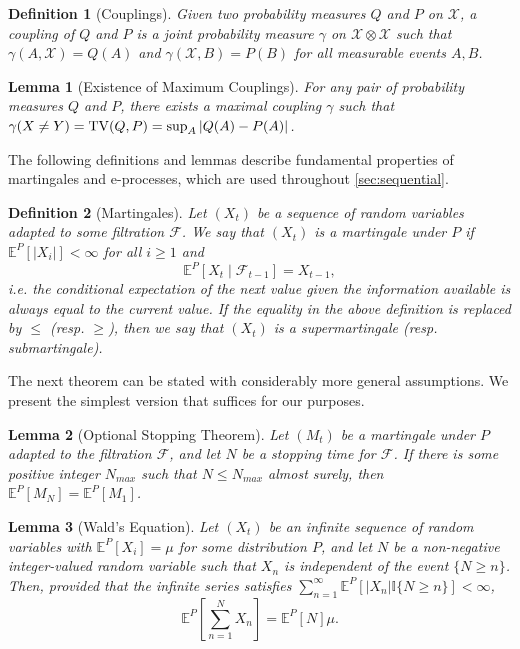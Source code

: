 \documentclass{article}
\DeclareMathOperator{\TVop}{TV}
\newcommand{\TV}[2]{
  \mathchoice
    {\TVop\!\left(#1,#2\right)}%
    {\TVop(#1,#2)}%
    {\TVop(#1,#2)}%
    {\TVop(#1,#2)}%
}
\newcommand{\E}{\mathbb{E}}
\newtheorem{lemma}{Lemma}[theorem]
\newtheorem{definition}{Definition}[section]
\begin{document}
\begin{definition}[Couplings]
    Given two probability measures $Q$ and $P$ on $\mathcal{X}$, a coupling of $Q$ and $P$ is a joint probability measure $\gamma$ on $\mathcal{X} \otimes \mathcal{X}$ such that $\gamma(A, \mathcal{X}) = Q(A)$ and $\gamma(\mathcal{X}, B) = P(B)$ for all measurable events $A, B$.
\end{definition}

\begin{lemma}[Existence of Maximum Couplings]\label{lem:tv-coupling}
    For any pair of probability measures $Q$ and $P$, there exists a maximal coupling $\gamma$ such that $\gamma(X \neq Y) = \TV{Q}{P} = \sup_A|Q(A) - P(A)|$. 
\end{lemma}

The following definitions and lemmas describe fundamental properties of martingales and e-processes, which are used throughout \cref{sec:sequential}.

\begin{definition}[Martingales]
    Let $(X_t)$ be a sequence of random variables adapted to some filtration $\mathcal{F}$. We say that $(X_t)$ is a martingale under $P$ if $\E^P[|X_i|] < \infty$ for all $i \geq 1$ and
    \begin{equation*}
        \E^P[X_t \mid \mathcal{F}_{t-1}] = X_{t-1},
    \end{equation*}
    i.e. the conditional expectation of the next value given the information available is always equal to the current value. If the equality in the above definition is replaced by $\leq$ (resp. $\geq$), then we say that $(X_t)$ is a supermartingale (resp. submartingale).
\end{definition}
 
The next theorem can be stated with considerably more general assumptions. We present the simplest version that suffices for our purposes. 

\begin{lemma}[Optional Stopping Theorem]\label{lem:optional_stopping}
    Let $(M_t)$ be a martingale under $P$ adapted to the filtration $\mathcal{F}$, and let $N$ be a stopping time for $\mathcal{F}$. If there is some positive integer $N_{max}$ such that $N \leq N_{max}$ almost surely, then $\E^P[M_N] = \E^P[M_1]$.
\end{lemma}

\begin{lemma}[Wald's Equation]\label{lem:wald}
    Let $(X_t)$ be an infinite sequence of random variables with $\E^P[X_i]=\mu$ for some distribution $P$, and let $N$ be a non-negative integer-valued random variable such that $X_n$ is independent of the event $\lbrace N \geq n\rbrace$. Then, provided that the infinite series satisfies $\sum_{n=1}^\infty \E^P[|X_n| \mathbb{I}\lbrace N \geq n \rbrace] < \infty$,
    \begin{equation*}
        \E^P\left[\sum_{n=1}^N X_n \right] = \E^P[N]\mu.
    \end{equation*}
\end{lemma}
\end{document}
